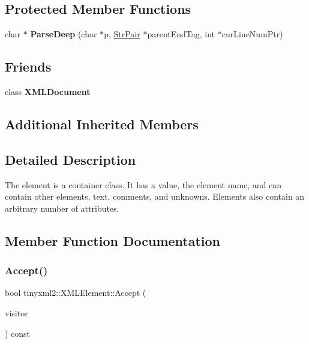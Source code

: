 \subsection*{Protected Member Functions}
\begin{DoxyCompactItemize}
\item 
\mbox{\label{classtinyxml2_1_1_x_m_l_element_a072998100b7d0ba5e8aeac6dd6dfb31b}} 
char $\ast$ {\bfseries Parse\+Deep} (char $\ast$p, \mbox{\hyperlink{classtinyxml2_1_1_str_pair}{Str\+Pair}} $\ast$parent\+End\+Tag, int $\ast$cur\+Line\+Num\+Ptr)
\end{DoxyCompactItemize}
\subsection*{Friends}
\begin{DoxyCompactItemize}
\item 
\mbox{\label{classtinyxml2_1_1_x_m_l_element_a4eee3bda60c60a30e4e8cd4ea91c4c6e}} 
class {\bfseries X\+M\+L\+Document}
\end{DoxyCompactItemize}
\subsection*{Additional Inherited Members}


\subsection{Detailed Description}
The element is a container class. It has a value, the element name, and can contain other elements, text, comments, and unknowns. Elements also contain an arbitrary number of attributes. 

\subsection{Member Function Documentation}
\mbox{\label{classtinyxml2_1_1_x_m_l_element_a9b2119831e8b85827d5d3e5076788e4a}} 
\subsubsection{\texorpdfstring{Accept()}{Accept()}}
{\footnotesize\ttfamily bool tinyxml2\+::\+X\+M\+L\+Element\+::\+Accept (\begin{DoxyParamCaption}\item[{\mbox{\hyperlink{classtinyxml2_1_1_x_m_l_visitor}{X\+M\+L\+Visitor}} $\ast$}]{visitor }\end{DoxyParamCaption}) const\hspace{0.3cm}{\ttfamily [virtual]}}

